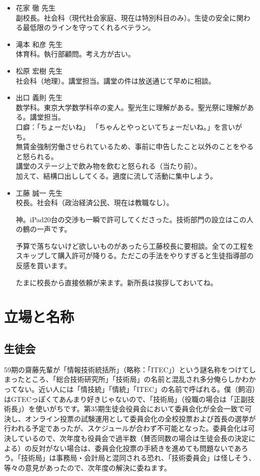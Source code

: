 \documentclass[dvipdfmx,jb5]{jreport}
\begin{document}
\begin{itemize}
      \item 花家 徹 先生\\
            副校長。社会科（現代社会家庭、現在は特別科目のみ）。生徒の安全に関わる最低限のラインを守ってくれるベテラン。

      \item 滝本 和彦 先生\\
            体育科。執行部顧問。考え方が古い。

      \item 松原 宏樹 先生\\
            社会科（地理）。講堂担当。講堂の件は放送通じて早めに相談。

      \item 出口 義則 先生\\
            数学科。東京大学数学科卒の変人。聖光生に理解がある。聖光祭に理解がある。講堂担当。
            \\口癖：「ちょーだいね」
            「ちゃんとやっといてちょーだいね。」を言いがち。\\
            無賃金強制労働させられているため、事前に申告したこと以外のことをやると怒られる。\\
            講堂のステージ上で飲み物を飲むと怒られる（当たり前）。\\
            加えて、結構口出ししてくる。適度に流して活動に集中しよう。

      \item 工藤 誠一 先生\\
            校長。社会科（政治経済公民、現在は教職なし）。

            神。iPad20台の交渉も一瞬で許可してくださった。技術部門の設立はこの人の鶴の一声です。

            予算で落ちないけど欲しいものがあったら工藤校長に要相談。全ての工程をスキップして購入許可が降りる。ただこの手法をやりすぎると生徒指導部の反感を買います。

            たまに校長から直接依頼が来ます。新所長は挨拶しておいてね。
\end{itemize}

\section{立場と名称}
\subsection{生徒会}
59期の齋藤先輩が「情報技術統括所」（略称：「ITEC」）という謎名称をつけてしまったところ、「総合技術研究所」「技術局」の名前と混乱され多分俺らしかわかってない。近い人には「情技統」「情統」「ITEC」の名前で呼ばれる。僕（飼沼）はGTECっぽくてあんまり好きじゃないので、「技術局」（役職の場合は「正副技術長」）を使いがちです。第35期生徒会役員会において委員会化が全会一致で可決し、オンライン投票の試験運用として委員会化の全校投票および首長の選挙が行われる予定であったが、スケジュールが合わず不可能となった。委員会化は可決しているので、次年度も役員会で過半数（賛否同数の場合は生徒会長の決定による）の反対がない場合は、委員会化投票の手続きを進めても問題ないであろう。「技術局」は事務局・会計局と混同される恐れ、「技術委員会」は怪しそう、等々の意見があったので、次年度の解決に委ねます。
\end{document}
